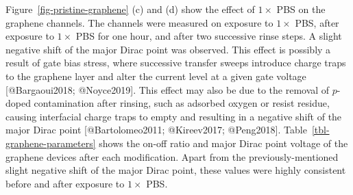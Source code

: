 \documentclass[
  letterpaper,
  DIV=11,
  numbers=noendperiod]{scrartcl}
\begin{document}
Figure~\ref{fig-pristine-graphene} (c) and (d) show the effect of
\(1 \times\) PBS on the graphene channels. The channels were measured on
exposure to \(1 \times\) PBS, after exposure to \(1 \times\) PBS for one
hour, and after two successive rinse steps. A slight negative shift of
the major Dirac point was observed. This effect is possibly a result of
gate bias stress, where successive transfer sweeps introduce charge
traps to the graphene layer and alter the current level at a given gate
voltage {[}@Bargaoui2018; @Noyce2019{]}. This effect may also be due to
the removal of \(p\)-doped contamination after rinsing, such as adsorbed
oxygen or resist residue, causing interfacial charge traps to empty and
resulting in a negative shift of the major Dirac point
{[}@Bartolomeo2011; @Kireev2017; @Peng2018{]}.
Table~\ref{tbl-graphene-parameters} shows the on-off ratio and major
Dirac point voltage of the graphene devices after each modification.
Apart from the previously-mentioned slight negative shift of the major
Dirac point, these values were highly consistent before and after
exposure to \(1 \times\) PBS.
\end{document}
